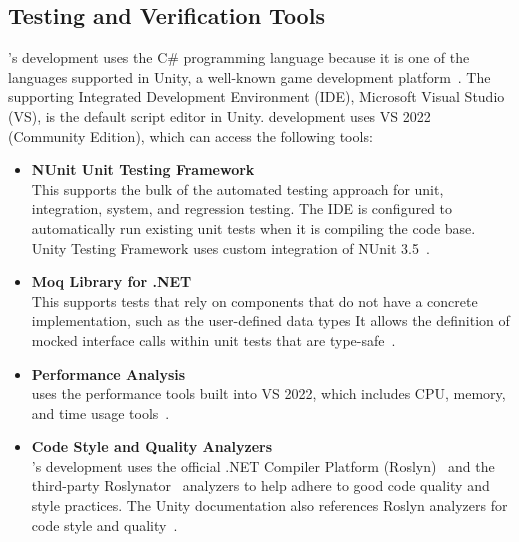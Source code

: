 \subsection{Testing and Verification Tools}\label{sec:tools}
\progname{}'s development uses the C\# programming language because it is one
of the languages supported in Unity, a well-known game development
platform~\citep{unity3Dcsharp}. The supporting Integrated Development
Environment (IDE), Microsoft Visual Studio (VS), is the default script editor
in Unity. \progname{} development uses VS 2022 (Community Edition), which can
access the following tools:
\begin{itemize}

    \item \textbf{NUnit Unit Testing Framework} \\
    This supports the bulk of the automated testing approach for unit,
    integration, system, and regression testing. The IDE is configured to
    automatically run existing unit tests when it is compiling the code base.
    Unity Testing Framework uses custom integration of NUnit
    3.5~\citep{unity3Dtestingfw}.

    \item \textbf{Moq Library for .NET} \\
    This supports tests that rely on components that do not have a concrete
    implementation, such as the user-defined data types
    It allows the definition of mocked
    interface calls within unit tests that are type-safe~\citep{moq}.

    \item \textbf{Performance Analysis} \\
    \progname{} uses the performance tools built into VS 2022, which includes
    CPU, memory, and time usage tools~\citep{vs2022perf}.

    \item \textbf{Code Style and Quality Analyzers} \\
    \progname{}'s development uses the official .NET Compiler Platform
    (Roslyn)~\citep{roslyn} and the third-party Roslynator~\citep{roslynator}
    analyzers to help adhere to good code quality and style practices. The
    Unity documentation also references Roslyn analyzers for code style and
    quality~\citep{unity3Droslyn}.

\end{itemize}